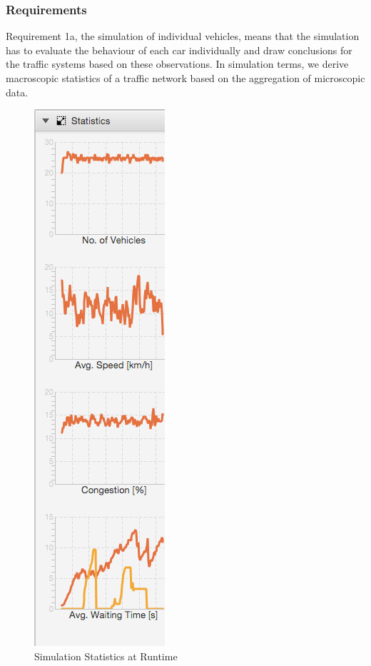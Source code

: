 \subsubsection{Requirements}
Requirement 1a, the simulation of individual vehicles, means that the simulation has to evaluate the behaviour of each car individually and draw conclusions for the traffic systems based on these observations. In simulation terms, we derive macroscopic statistics of a traffic network based on the aggregation of microscopic data.

\begin{figure}
	\begin{center}
		\includegraphics[scale=0.5]{img/graphs.png}
		\caption[Simulation Statistics at Runtime]{Simulation Statistics at Runtime}
		\label{fig:graphs}
	\end{center}
\end{figure}

